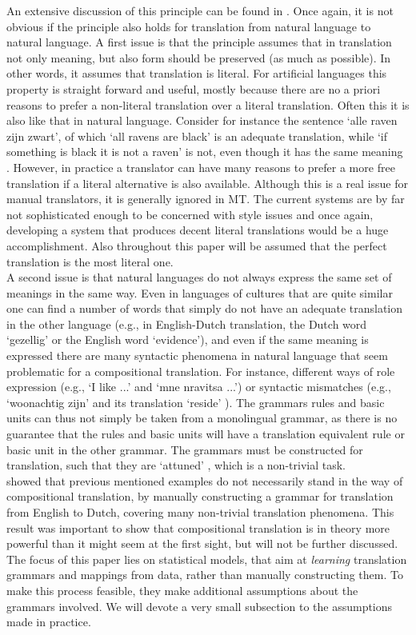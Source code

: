 \documentclass{report}
\newcommand\textcyr[1]{{\fontencoding{OT2}\fontfamily{wncyr}\selectfont #1}}
\theoremstyle{definition}
\theoremstyle{plain}
\begin{document}
An extensive discussion of this principle can be found in \cite{janssen1998algebraic}. Once again, it is not obvious if the principle also holds for translation from natural language to natural language. A first issue is that the principle assumes that in translation not only meaning, but also form should be preserved (as much as possible). In other words, it assumes that translation is literal. For artificial languages this property is straight forward and useful, mostly because there are no a priori reasons to prefer a non-literal translation over a literal translation. Often this it is also like that in natural language. Consider for instance the sentence `alle raven zijn zwart', of which `all ravens are black' is an adequate translation, while `if something is black it is not a raven' is not, even though it has the same meaning \citep{landsbergen1989power}. However, in practice a translator can have many reasons to prefer a more free translation if a literal alternative is also available. Although this is a real issue for manual translators, it is generally ignored in MT. The current systems are by far not sophisticated enough to be concerned with style issues and once again, developing a system that produces decent literal translations would be a huge accomplishment. Also throughout this paper will be assumed that the perfect translation is the most literal one.\\
A second issue is that natural languages do not always express the same set of meanings in the same way. Even in languages of cultures that are quite similar one can find a number of words that simply do not have an adequate translation in the other language (e.g., in English-Dutch translation, the Dutch word `gezellig' or the English word `evidence'), and even if the same meaning is expressed there are many syntactic phenomena in natural language that seem problematic for a compositional translation. For instance, different ways of role expression (e.g., `I like ...' and `\textcyr{mne nravitsa ...}') or syntactic mismatches (e.g., `woonachtig zijn' and its translation `reside' \citep{landsbergen1989power}). The grammars rules and basic units can thus not simply be taken from a monolingual grammar, as there is no guarantee that the rules and basic units will have a translation equivalent rule or basic unit in the other grammar. The grammars must be constructed for translation, such that they are `attuned' \citep{rosetta1994compositional}, which is a non-trivial task.\\
\cite{rosetta1994compositional} showed that previous mentioned examples do not necessarily stand in the way of compositional translation, by manually constructing a grammar for translation from English to Dutch, covering many non-trivial translation phenomena. This result was important to show that compositional translation is in theory more powerful than it might seem at the first sight, but will not be further discussed. The focus of this paper lies on statistical models, that aim at \textit{learning} translation grammars and mappings from data, rather than manually constructing them. To make this process feasible, they make additional assumptions about the grammars involved. We will devote a very small subsection to the assumptions made in practice.
\end{document}
